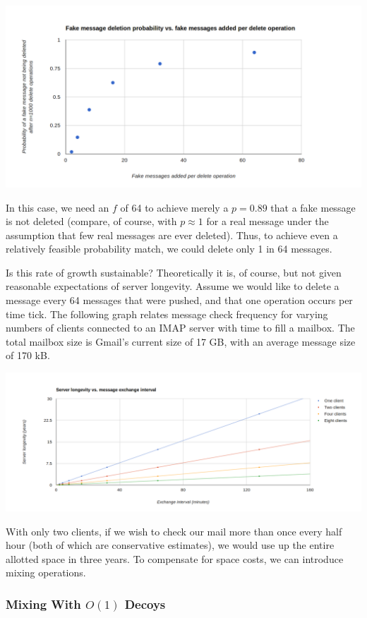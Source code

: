 \documentclass[pageno]{jpaper}
\begin{document}
\includegraphics[width=\textwidth]{fake-message-deletion-probability-vs-num-fake-messages-added}

In this case, we need an $f$ of 64 to achieve merely a $p=0.89$ that a fake message is not deleted (compare, of course, with $p \approx 1$ for a real message under the assumption that few real messages are ever deleted). Thus, to achieve even a relatively feasible probability match, we could delete only 1 in 64 messages.

Is this rate of growth sustainable? Theoretically it is, of course, but not given reasonable expectations of server longevity. Assume we would like to delete a message every 64 messages that were pushed, and that one operation occurs per time tick. The following graph relates message check frequency for varying numbers of clients connected to an IMAP server with time to fill a mailbox. The total mailbox size is Gmail's current size of 17 GB, with an average message size of 170 kB.

\includegraphics[width=\textwidth]{server_longevity}

With only two clients, if we wish to check our mail more than once every half hour (both of which are conservative estimates), we would use up the entire allotted space in three years. To compensate for space costs, we can introduce mixing operations.

\subsubsection{Mixing With \texorpdfstring{$O(1)$}{O(1)} Decoys}
\end{document}
